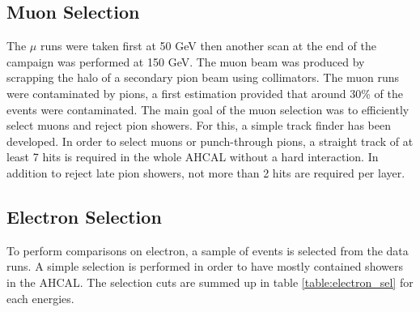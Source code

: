 \subsection{Muon Selection}
The $\mu$ runs were taken first at 50 GeV then another scan at the end of the campaign was performed at 150 GeV. The muon beam was produced by scrapping the halo of a secondary pion beam using collimators. The muon runs were contaminated by pions, a first estimation provided that around 30\% of the events were contaminated. The main goal of the muon selection was to efficiently select muons and reject pion showers. For this, a simple track finder has been developed. In order to select muons or punch-through pions, a straight track of at least 7 hits is required in the whole AHCAL without a hard interaction. In addition to reject late pion showers, not more than 2 hits are required per layer.

\begin{table}[t]
	\centering
	\caption{Selection cuts for muon runs.}
	\label{table:muon_sel}
\end{table}

\subsection{Electron Selection}
\label{subsec:elec_sel}
To perform comparisons on electron, a sample of events is selected from the data runs. A simple selection is performed in order to have mostly contained showers in the AHCAL. The selection cuts are summed up in table \ref{table:electron_sel} for each energies.

